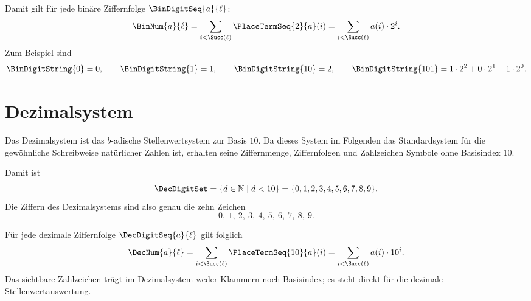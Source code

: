 \documentclass[main.tex]{subfiles}
\begin{document}


Damit gilt für jede binäre Ziffernfolge \(\BinDigitSeq{a}{\ell}\):
\[
  \BinNum{a}{\ell}
  =
  \sum_{i<\Succ(\ell)} \PlaceTermSeq{2}{a}(i)
  =
  \sum_{i<\Succ(\ell)} a(i)\cdot 2^i.
\]
Zum Beispiel sind
\[
  \BinDigitString{0}=0,\qquad
  \BinDigitString{1}=1,\qquad
  \BinDigitString{10}=2,\qquad
  \BinDigitString{101}=1\cdot 2^2+0\cdot 2^1+1\cdot 2^0.
\]

\section{Dezimalsystem}

Das Dezimalsystem ist das \(b\)-adische Stellenwertsystem zur Basis \(10\).
Da dieses System im Folgenden das Standardsystem für die gewöhnliche
Schreibweise natürlicher Zahlen ist, erhalten seine Ziffernmenge,
Ziffernfolgen und Zahlzeichen Symbole ohne Basisindex \(10\).


Damit ist
\[
  \DecDigitSet
  =
  \{d\in\mathbb{N}\mid d<10\}
  =
  \{0,1,2,3,4,5,6,7,8,9\}.
\]
Die Ziffern des Dezimalsystems sind also genau die zehn Zeichen
\[
  0,\ 1,\ 2,\ 3,\ 4,\ 5,\ 6,\ 7,\ 8,\ 9.
\]




Für jede dezimale Ziffernfolge \(\DecDigitSeq{a}{\ell}\) gilt folglich
\[
  \DecNum{a}{\ell}
  =
  \sum_{i<\Succ(\ell)} \PlaceTermSeq{10}{a}(i)
  =
  \sum_{i<\Succ(\ell)} a(i)\cdot 10^i.
\]
Das sichtbare Zahlzeichen trägt im Dezimalsystem weder Klammern noch
Basisindex; es steht direkt für die dezimale Stellenwertauswertung.
\end{document}
